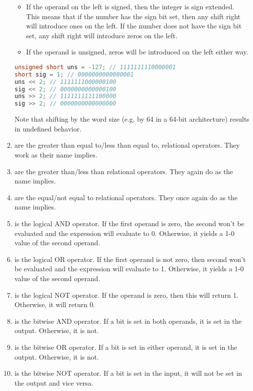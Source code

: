 \begin{enumerate}
	      \begin{itemize}
		      \item If the operand on the left is signed, then the integer is sign extended. This means that if the number has the sign bit set, then any shift right will introduce ones on the left. If the number does not have the sign bit set, any shift right will introduce zeros on the left.
		      \item If the operand is unsigned, zeros will be introduced on the left either way.
	      \end{itemize}

	      \begin{lstlisting}[language=C]
unsigned short uns = -127; // 1111111110000001
short sig = 1; // 0000000000000001
uns << 2; // 1111111000000100
sig << 2; // 0000000000000100
uns >> 2; // 1111111111100000
sig >> 2; // 0000000000000000
\end{lstlisting}
    Note that shifting by the word size (e.g. by 64 in a 64-bit architecture) results in undefined behavior.
	\item \keyword{<=/>=} are the greater than equal to/less than equal to, relational operators. They work as their name implies.
	\item \keyword{</>} are the greater than/less than relational operators. They again do as the name implies.
	\item \keyword{==/\!=} are the equal/not equal to relational operators. They once again do as the name implies.
	\item \keyword{\&\&} is the logical AND operator. If the first operand is zero, the second won't be evaluated and the expression will evaluate to 0. Otherwise, it yields a 1-0 value of the second operand.
	\item \keyword{||} is the logical OR operator. If the first operand is not zero, then second won't be evaluated and the expression will evaluate to 1. Otherwise, it yields a 1-0 value of the second operand.
	\item \keyword{!} is the logical NOT operator. If the operand is zero, then this will return 1. Otherwise, it will return 0.
	\item \keyword{\&} is the bitwise AND operator. If a bit is set in both operands, it is set in the output. Otherwise, it is not.
	\item \keyword{|} is the bitwise OR operator. If a bit is set in either operand, it is set in the output. Otherwise, it is not.
	\item \keyword{~~} is the bitwise NOT operator. If a bit is set in the input, it will not be set in the output and vice versa.

\end{enumerate}
